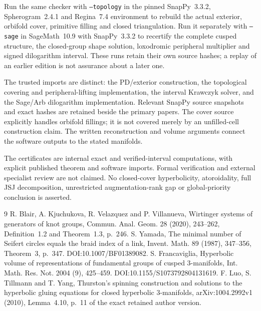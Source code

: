 \documentclass[11pt]{article}
\begin{document}
Run the same checker with \texttt{--topology} in the pinned
SnapPy~3.3.2, Spherogram~2.4.1 and Regina~7.4 environment to rebuild the
actual exterior, orbifold cover, primitive filling and closed
triangulation. Run it separately with \texttt{--sage} in SageMath~10.9
with SnapPy~3.3.2 to recertify the complete cusped structure, the
closed-group shape solution, loxodromic peripheral multiplier and
signed dilogarithm interval. These runs retain their own source hashes;
a replay of an earlier edition is not assurance about a later one.

The trusted imports are distinct: the PD/exterior construction,
the topological covering and peripheral-lifting implementation,
the interval Krawczyk solver, and the Sage/Arb dilogarithm implementation.
Relevant SnapPy source snapshots and exact hashes are retained beside
the primary papers. The cover source explicitly handles orbifold
fillings; it is not covered merely by an unfilled-cell construction
claim. The written reconstruction and volume arguments connect the
software outputs to the stated manifolds.

The certificates are internal exact and verified-interval computations,
with explicit published theorem and software imports. Formal
verification and external specialist review are not claimed.
No closed-cover hyperbolicity, atoroidality, full JSJ decomposition,
unrestricted augmentation-rank gap or global-priority conclusion is
asserted.

\begin{thebibliography}{9}\small
{} R. Blair, A. Kjuchukova, R. Velazquez and P. Villanueva,
Wirtinger systems of generators of knot groups,
Commun. Anal. Geom. 28 (2020), 243--262,
Definition~1.2 and Theorem~1.3, p.~246.
 S. Yamada, The minimal number of Seifert circles equals
the braid index of a link, Invent. Math. 89 (1987), 347--356,
Theorem~3, p.~347. DOI:10.1007/BF01389082.
 S. Francaviglia, Hyperbolic volume of
representations of fundamental groups of cusped 3-manifolds,
Int. Math. Res. Not. 2004 (9), 425--459.
DOI:10.1155/S1073792804131619.
 F. Luo, S. Tillmann and T. Yang,
Thurston's spinning construction and solutions to the hyperbolic
gluing equations for closed hyperbolic 3-manifolds,
arXiv:1004.2992v1 (2010), Lemma~4.10, p.~11 of the exact retained
author version.
\end{thebibliography}
\end{document}
